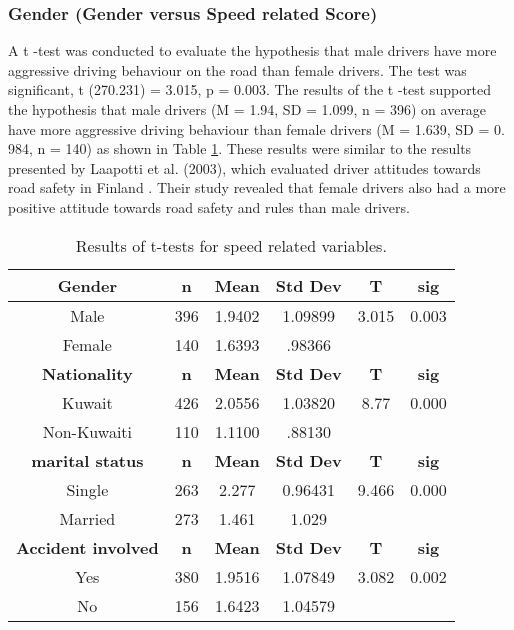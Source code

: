 \documentclass[preprint,12pt,a4paper,authoryear]{elsarticle}
\begin{document}
\subsubsection{Gender (Gender versus Speed related Score)}

A t -test was conducted to evaluate the hypothesis that male drivers have more aggressive driving behaviour on the road than female drivers. The test was significant, t (270.231) = 3.015, p = 0.003. The results of the t -test supported the hypothesis that male drivers (M = 1.94, SD = 1.099, n = 396) on average have more aggressive driving behaviour than female drivers (M = 1.639, SD = 0. 984, n = 140) as shown in Table \ref{tab:sexdiff}. These results were similar to the results presented by Laapotti et al. (2003), which evaluated driver attitudes towards road safety in Finland \citep{Laapotti2003}. Their study revealed that female drivers also had a more positive attitude towards road safety and rules than male drivers.

\begin{table}[H]
\centering
\caption{Results of t-tests for speed related variables.}
\label{tab:sexdiff}
\begin{tabular}{@{}cccccc@{}}
\toprule
\textbf{Gender} & \textbf{n} & \textbf{Mean} & \textbf{Std Dev} & \textbf{T} & \textbf{sig} \\ \midrule
Male & 396 & 1.9402 & 1.09899 & 3.015 & 0.003 \\
Female & 140 & 1.6393 & .98366 &  &  \\ \midrule
\textbf{Nationality} & \textbf{n} & \textbf{Mean} & \textbf{Std Dev} & \textbf{T} & \textbf{sig} \\ \midrule
Kuwait & 426 & 2.0556 & 1.03820 & 8.77 & 0.000 \\
Non-Kuwaiti & 110 & 1.1100 & .88130 &  &  \\ \midrule
\textbf{marital status} & \textbf{n} & \textbf{Mean} & \textbf{Std Dev} & \textbf{T} & \textbf{sig} \\ \midrule
Single & 263 & 2.277 & 0.96431 & 9.466 & 0.000 \\
Married & 273 & 1.461 & 1.029 &  &  \\ \midrule
\textbf{Accident involved} & \textbf{n} & \textbf{Mean} & \textbf{Std Dev} & \textbf{T} & \textbf{sig} \\ \midrule
Yes & 380 & 1.9516 & 1.07849 & 3.082 & 0.002 \\
No & 156 & 1.6423 & 1.04579 &  &  \\ \bottomrule
\end{tabular}
\end{table}
\end{document}
